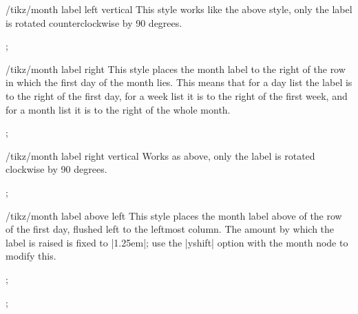 \begin{stylekey}{/tikz/month label left vertical}
    This style works like the above style, only the label is rotated
    counterclockwise by 90 degrees.
\begin{codeexample}[]
\tikz
  \calendar [dates=2000-01-28 to 2000-02-03,
             day list downward,month yshift=1em,
             month label left vertical];
\end{codeexample}
\end{stylekey}

\begin{stylekey}{/tikz/month label right}
    This style places the month label to the right of the row in which the
    first day of the month lies. This means that for a day list the label is to
    the right of the first day, for a week list it is to the right of the first
    week, and for a month list it is to the right of the whole month.
\begin{codeexample}[]
\tikz
  \calendar [dates=2000-01-28 to 2000-02-03,
             day list downward,month yshift=1em,
             month label right];
\end{codeexample}
\end{stylekey}

\begin{stylekey}{/tikz/month label right vertical}
    Works as above, only the label is rotated clockwise by 90 degrees.
\begin{codeexample}[]
\tikz
  \calendar [dates=2000-01-28 to 2000-02-03,
             day list downward,month yshift=1em,
             month label right vertical];
\end{codeexample}
\end{stylekey}

\begin{stylekey}{/tikz/month label above left}
    This style places the month label above of the row of the first day,
    flushed left to the leftmost column. The amount by which the label is
    raised is fixed to |1.25em|; use the |yshift| option with the month node to
    modify this.
\begin{codeexample}[]
\tikz
  \calendar [dates=2000-01-28 to 2000-02-03,
             day list right,month xshift=1em,
             month label above left];
\end{codeexample}
\begin{codeexample}[]
\tikz
  \calendar [dates=2000-01-20 to 2000-02-10,
             week list,month label above left];
\end{codeexample}
\end{stylekey}

